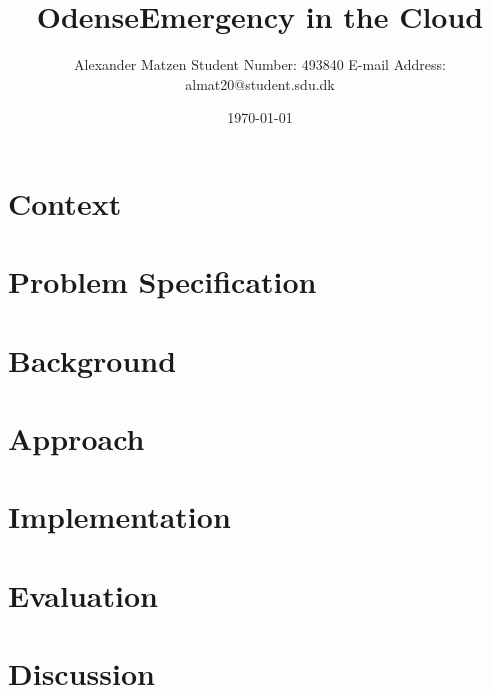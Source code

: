 \documentclass[11pt]{article}
\begin{document}
\setlength\parindent{0pt}
\setlength{\parskip}{.15em}
\pagestyle{empty}

\title{OdenseEmergency in the Cloud \newline}
\author{Alexander Matzen \addvspace{1em} Student Number: 493840 \newline E-mail Address: almat20@student.sdu.dk}
\date{\today}


\pagecolor{white}


\section{Context}

\section{Problem Specification}

\section{Background}
%


\section{Approach}

\section{Implementation}

\section{Evaluation}

\section{Discussion}
\end{document}
